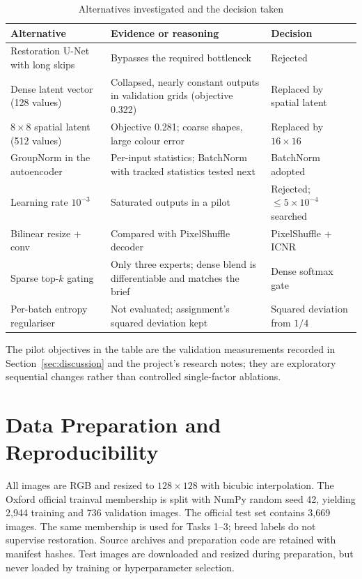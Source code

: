 \documentclass[conference]{IEEEtran}
\begin{document}
\begin{table}[!ht]\centering\caption{Alternatives investigated and the decision taken}\scriptsize
\renewcommand{\arraystretch}{1.12}\begin{tabular}{>{\raggedright\arraybackslash}p{.25\linewidth}>{\raggedright\arraybackslash}p{.36\linewidth}>{\raggedright\arraybackslash}p{.24\linewidth}}\toprule
Alternative & Evidence or reasoning & Decision\\\midrule
Restoration U-Net with long skips & Bypasses the required bottleneck \cite{unet} & Rejected\\
Dense latent vector (128 values) & Collapsed, nearly constant outputs in validation grids (objective 0.322) & Replaced by spatial latent\\
$8{\times}8$ spatial latent (512 values) & Objective 0.281; coarse shapes, large colour error & Replaced by $16{\times}16$\\
GroupNorm in the autoencoder & Per-input statistics; BatchNorm \cite{batchnorm} with tracked statistics tested next & BatchNorm adopted\\
Learning rate $10^{-3}$ & Saturated outputs in a pilot & Rejected; $\le 5{\times}10^{-4}$ searched\\
Bilinear resize + conv & Compared with PixelShuffle decoder \cite{shi} & PixelShuffle + ICNR \cite{aitken}\\
Sparse top-$k$ gating \cite{shazeer} & Only three experts; dense blend is differentiable and matches the brief & Dense softmax gate\\
Per-batch entropy regulariser \cite{switch} & Not evaluated; assignment's squared deviation kept & Squared deviation from $1/4$\\\bottomrule
\end{tabular}\end{table}
The pilot objectives in the table are the validation measurements recorded
in Section~\ref{sec:discussion} and the project's research notes; they are
exploratory sequential changes rather than controlled single-factor ablations.

\section{Data Preparation and Reproducibility}
All images are RGB and resized to $128\times128$ with bicubic interpolation.
The Oxford official trainval membership \cite{pets} is split with NumPy random seed 42,
yielding 2,944 training and 736 validation images. The official test set contains
3,669 images. The same membership is used for Tasks 1--3; breed labels do not
supervise restoration. Source archives and preparation code are retained with
manifest hashes. Test images are downloaded and resized during preparation,
but never loaded by training or hyperparameter selection.
\end{document}
